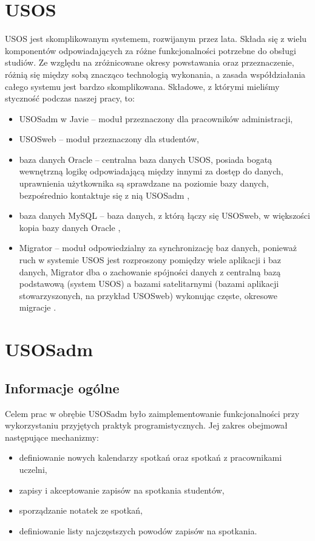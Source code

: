 \documentclass[licencjacka]{pracamgr}
\begin{document}
\section{USOS}
USOS jest skomplikowanym systemem, rozwijanym przez lata. Składa się z wielu komponentów odpowiadających za różne funkcjonalności potrzebne do obsługi studiów. Ze względu na zróżnicowane okresy powstawania oraz przeznaczenie, różnią się między sobą znacząco technologią wykonania, a zasada współdziałania całego systemu jest bardzo skomplikowana.
Składowe, z którymi mieliśmy styczność podczas naszej pracy, to:
\begin{itemize}
\item USOSadm w Javie -- moduł przeznaczony dla pracowników administracji,
\item USOSweb -- moduł przeznaczony dla studentów,
\item baza danych Oracle -- centralna baza danych USOS, posiada bogatą wewnętrzną logikę odpowiadającą między innymi za dostęp do danych, uprawnienia użytkownika są sprawdzane na poziomie bazy danych, bezpośrednio kontaktuje się z nią USOSadm \cite{rfd},
\item baza danych MySQL -- baza danych, z którą łączy się USOSweb, w większości kopia bazy danych Oracle \cite{wikibd},
\item Migrator -- moduł odpowiedzialny za synchronizację baz danych, ponieważ ruch w systemie USOS jest rozproszony pomiędzy wiele aplikacji i baz danych, Migrator dba o zachowanie spójności danych z centralną bazą podstawową (system USOS) a bazami satelitarnymi (bazami aplikacji stowarzyszonych, na przykład USOSweb) wykonując częste, okresowe migracje \cite{wdr}.
\end{itemize}

\section{USOSadm} \label{sec:impusos}

\subsection{Informacje ogólne}
Celem prac w obrębie USOSadm było zaimplementowanie funkcjonalności przy wykorzystaniu przyjętych praktyk programistycznych. Jej zakres obejmował następujące mechanizmy:
\begin{itemize}
\item definiowanie nowych kalendarzy spotkań oraz spotkań z pracownikami uczelni,
\item zapisy i akceptowanie zapisów na spotkania studentów,
\item sporządzanie notatek ze spotkań,
\item definiowanie listy najczęstszych powodów zapisów na spotkania.
\end{itemize}
\end{document}
